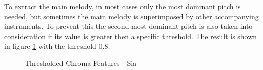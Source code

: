 To extract the main melody, in most cases only the most dominant pitch is needed, but sometimes the main melody is superimposed by other accompanying instruments. To prevent this the second most dominant pitch is also taken into consideration if its value is greater then a specific threshold. 
The result is shown in figure \ref{fig:chromavg} with the threshold 0.8. 
\begin{figure}[htbp]
	\centering
	\caption{Thresholded Chroma Features - Sia}
	\label{fig:chromavg}
\end{figure}

